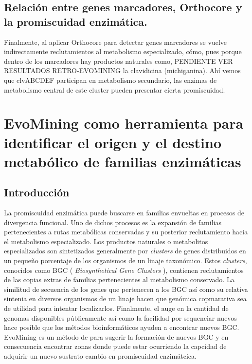 \documentclass[12pt,twoside]{reedthesis}
\begin{document}
  \section{Relación entre genes marcadores, Orthocore y la promiscuidad
  enzimática.}\label{relacion-entre-genes-marcadores-orthocore-y-la-promiscuidad-enzimatica.}
  
  Finalmente, al aplicar Orthocore para detectar genes marcadores se
  vuelve indirectamente reclutamientos al metabolismo especializado, cómo,
  pues porque dentro de los marcadores hay productos naturales como,
  PENDIENTE VER RESULTADOS RETRO-EVOMINING la clavidicina (michiganina).
  Ahí vemos que clvABCDEF participan en metabolismo secundario, las
  enzimas de metabolismo central de este cluster pueden presentar cierta
  promiscuidad.
  
  \chapter{EvoMining como herramienta para identificar el origen y el
  destino metabólico de familias
  enzimáticas}\label{evomining-como-herramienta-para-identificar-el-origen-y-el-destino-metabolico-de-familias-enzimaticas}
  
  \section{Introducción}\label{introduccion-1}
  
  La promiscuidad enzimática puede buscarse en familias envueltas en
  procesos de divergencia funcional. Uno de dichos procesos es la
  expansión de familias pertenecientes a rutas metabólicas conservadas y
  su posterior reclutamiento hacia el metabolismo especializado. Los
  productos naturales o metabolitos especializados son sintetizados
  generalmente por \emph{clusters} de genes distribuidos en un pequeño
  porcentaje de los organismos de un linaje taxonómico. Estos
  \emph{clusters}, conocidos como BGC ( \emph{Biosynthetical Gene
  Clusters} ), contienen reclutamientos de las copias extras de familias
  pertenecientes al metabolismo conservado. La similitud de secuencia de
  los genes que pertenecen a los BGC así como su relativa sintenia en
  diversos organismos de un linaje hacen que genómica copmarativa sea de
  utilidad para intentar localizarlos. Finalmente, el auge en la cantidad
  de genomas disponibles públicamente así como la facilidad por sequenciar
  nuevos hace posible que los métodos bioinformáticos ayuden a encontrar
  nuevos BGC. EvoMining es un método de para sugerir la formación de
  nuevos BGC y en consecuencia encontrar zonas donde puede estar
  ocurriendo la capcidad de adquirir un nuevo sustrato cambio en
  promiscuidad enzimátcica.
  
\end{document}

